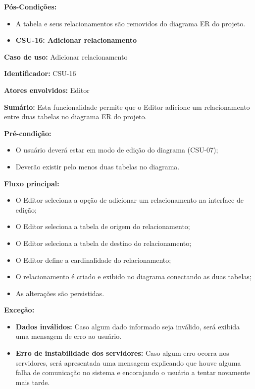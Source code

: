 \textbf{Pós-Condições:}
\begin{itemize}
    \item A tabela e seus relacionamentos são removidos do diagrama ER do projeto.
\end{itemize}

\vspace{1em}

\begin{itemize}
    \item \textbf{CSU-16: Adicionar relacionamento}
\end{itemize}

\textbf{Caso de uso:} Adicionar relacionamento

\textbf{Identificador:} CSU-16

\textbf{Atores envolvidos:} Editor

\textbf{Sumário:} Esta funcionalidade permite que o Editor adicione um relacionamento entre duas tabelas no diagrama ER do projeto.

\textbf{Pré-condição:}
\begin{itemize}
    \item O usuário deverá estar em modo de edição do diagrama (CSU-07);
    \item Deverão existir pelo menos duas tabelas no diagrama.
\end{itemize}

\textbf{Fluxo principal:}
\begin{itemize}
    \item O Editor seleciona a opção de adicionar um relacionamento na interface de edição;
    \item O Editor seleciona a tabela de origem do relacionamento;
    \item O Editor seleciona a tabela de destino do relacionamento;
    \item O Editor define a cardinalidade do relacionamento;
    \item O relacionamento é criado e exibido no diagrama conectando as duas tabelas;
    \item As alterações são persistidas.
\end{itemize}

\textbf{Exceção:}
\begin{itemize}
    \item \textbf{Dados inválidos:} Caso algum dado informado seja inválido, será exibida uma mensagem de erro ao usuário.
    \item \textbf{Erro de instabilidade dos servidores:} Caso algum erro ocorra nos servidores, será apresentada uma mensagem explicando que houve alguma falha de comunicação no sistema e encorajando o usuário a tentar novamente mais tarde.
\end{itemize}

